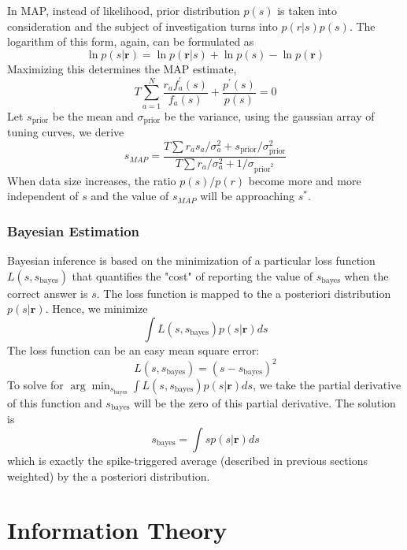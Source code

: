 \documentclass[11pt]{article}
\begin{document}
In MAP, instead of likelihood, prior distribution $p(s)$ is taken into consideration and the subject of investigation turns into $p(r|s)p(s)$. The logarithm of this form, again, can be formulated as
\begin{equation*}
    \ln p(s|\mathbf{r})=\ln p(\mathbf{r}|s)+\ln p(s)-\ln p(\mathbf{r})
\end{equation*}
Maximizing this determines the MAP estimate,
\begin{equation*}
    T\sum_{a=1}^N \frac{r_a f_a^{'}(s)}{f_a(s)}+\frac{p^{'}(s)}{p(s)}=0
\end{equation*}
Let $s_{\text{prior}}$ be the mean and $\sigma_{\text{prior}}$ be the variance, using the gaussian array of tuning curves, we derive
\begin{equation*}
    s_{MAP}=\frac{T\sum r_as_a / \sigma_a^2+s_{\text{prior}}/\sigma_{\text{prior}}^2}{T\sum r_a/\sigma_a^2+1/\sigma_{\text{prior}^2}}
\end{equation*}
When data size increases, the ratio $p(s)/p(r)$ become more and more independent of $s$ and the value of $s_{MAP}$ will be approaching $s^*$.

\subsubsection{Bayesian Estimation}

Bayesian inference is based on the minimization of a particular loss function $L(s,s_{\text{bayes}})$ that quantifies the "cost" of reporting the value of $s_{\text{bayes}}$ when the correct answer is $s$. The loss function is mapped to the a posteriori distribution $p(s|\mathbf{r})$. Hence, we minimize\begin{equation*}
    \int L(s,s_{\text{bayes}})p(s|\mathbf{r})ds
\end{equation*}
The loss function can be an easy mean square error:
\begin{equation*}
    L(s,s_{\text{bayes}})=(s-s_{\text{bayes}})^2
\end{equation*}
To solve for $\arg \min_{s_{\text{bayes}}} \int L(s,s_{\text{bayes}})p(s|\mathbf{r})ds$, we take the partial derivative of this function and $s_{\text{bayes}}$ will be the zero of this partial derivative. The solution is
\begin{equation*}
    s_{\text{bayes}}=\int sp(s|\mathbf{r})ds
\end{equation*}
which is exactly the spike-triggered average (described in previous sections weighted) by the a posteriori distribution.

\newpage
\section{Information Theory}
\end{document}
